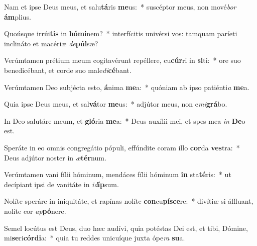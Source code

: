 \item Nam et ipse Deus meus, et salu\textbf{tá}ris \textbf{me}us:~* suscéptor meus, non mové\textit{bor} \textbf{ám}plius.
\item Quoúsque irrúi\textbf{tis} in \textbf{hó}\textbf{mi}nem?~* interfícitis univérsi vos: tamquam paríeti inclináto et macériæ \textit{de}\textbf{púl}sæ?
\item Verúmtamen prétium meum cogitavérunt repéllere, cu\textbf{cúr}ri in \textbf{si}ti:~* ore suo benedicébant, et corde suo male\textit{di}\textbf{cé}bant.
\item Verúmtamen Deo subjécta esto, \textbf{á}nima \textbf{me}a:~* quóniam ab ipso patiénti\textit{a} \textbf{me}a.
\item Quia ipse Deus meus, et sal\textbf{vá}tor \textbf{me}us:~* adjútor meus, non e\textit{mi}\textbf{grá}bo.
\item In Deo salutáre meum, et \textbf{gló}ria \textbf{me}a:~* Deus auxílii mei, et spes mea \textit{in} \textbf{De}o est.
\item Speráte in eo omnis congregátio pópuli, effúndite coram illo \textbf{cor}da \textbf{ves}tra:~* Deus adjútor noster in \textit{æ}\textbf{tér}num.
\item Verúmtamen vani fílii hóminum, mendáces fílii hóminum \textbf{in} sta\textbf{té}ris:~* ut decípiant ipsi de vanitáte in \textit{id}\textbf{íp}sum.
\item Nolíte speráre in iniquitáte, et rapínas nolíte \textbf{con}cu\textbf{pí}\textbf{sce}re:~* divítiæ si áffluant, nolíte cor \textit{ap}\textbf{pó}nere.
\item Semel locútus est Deus, duo hæc audívi, quia potéstas Dei est, et tibi, Dómine, mi\textbf{se}ri\textbf{cór}\textbf{di}a:~* quia tu reddes unicuíque juxta ópe\textit{ra} \textbf{su}a.
